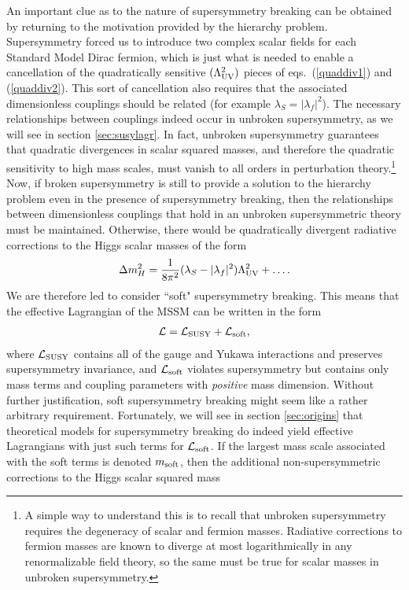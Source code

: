 \documentclass[12pt]{article}
\def\beq{\begin{eqnarray}}
\def\eeq{\end{eqnarray}}
\def\lagr{{\cal L}}
\begin{document}
An important clue as to the nature of supersymmetry breaking can be
obtained by returning to the motivation provided by the hierarchy problem.
Supersymmetry forced us to introduce two complex scalar fields for each
Standard Model Dirac fermion, which is just what is needed to enable a
cancellation of the quadratically sensitive $(\Lambda_{\rm UV}^2)$ pieces
of eqs.~(\ref{quaddiv1}) and (\ref{quaddiv2}). This sort of cancellation
also requires that the associated dimensionless couplings should be
related (for example $\lambda_S = |\lambda_f|^2$). The necessary relationships
between couplings indeed occur in unbroken supersymmetry, as we will see
in section \ref{sec:susylagr}. In fact, unbroken supersymmetry guarantees
that quadratic divergences in scalar squared masses, and therefore the quadratic sensitivity to high mass scales, must vanish to all
orders in perturbation theory.\footnote{A simple way to understand this is
to recall that unbroken supersymmetry requires the degeneracy of scalar
and fermion masses. Radiative corrections to fermion masses are known to
diverge at most logarithmically in any renormalizable
field theory, so the same must be
true for scalar masses in unbroken supersymmetry.} Now, if broken
supersymmetry is still to provide a solution to the hierarchy problem even
in the presence of supersymmetry breaking, then the relationships between
dimensionless couplings that hold in an unbroken supersymmetric theory
must be maintained. Otherwise, there would be quadratically divergent
radiative corrections to the Higgs scalar masses of the form
\beq
\Delta m_H^2 = {1\over 8\pi^2} (\lambda_S - |\lambda_f|^2)
\Lambda_{\rm UV}^2 + \ldots .
\label{eq:royalewithcheese}
\eeq
We are therefore led to consider ``soft" supersymmetry breaking. This
means that the effective Lagrangian of the MSSM can be written in the form
\beq
\lagr = \lagr_{\rm SUSY} + \lagr_{\rm soft},
\eeq
where $\lagr_{\rm SUSY}$ contains all of the gauge and Yukawa interactions
and preserves supersymmetry invariance, and $\lagr_{\rm soft}$ violates
supersymmetry but contains only mass terms and coupling parameters with {\it
positive} mass dimension. Without further justification, soft
supersymmetry breaking might seem like a rather arbitrary requirement.
Fortunately, we will see in section \ref{sec:origins} that theoretical
models for supersymmetry breaking do indeed yield effective Lagrangians
with just such terms for $\lagr_{\rm soft}$. If the largest mass scale
associated with the soft terms is denoted $m_{\rm soft}$, then the
additional non-supersymmetric corrections to the Higgs scalar squared mass
\end{document}
